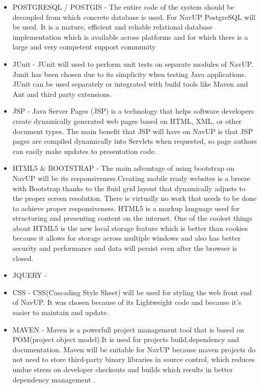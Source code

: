 \begin{itemize}
	\item POSTGRESQL / POSTGIS - The entire code of the system should be decoupled from which concrete database is used. For NavUP PostgreSQL will be used. It is a mature, efficient and reliable relational database implementation which is available across platforms and for which there is a large and very competent support community
	
	\item JUnit - JUnit will used to perform unit tests on separate modules of NavUP. Junit has been chosen due to its simplicity when testing Java applications. JUnit can be used separately or integrated with build tools like Maven and Ant and third party extensions.
	
	\item JSP - Java Server Pages (JSP) is a technology that helps software developers create dynamically generated web pages based on HTML, XML, or other document types. The main benefit that JSP will have on NavUP is that JSP pages are compiled dynamically into Servlets when requested, so page authors can easily make updates to presentation code.
	
	\item HTML5 \& BOOTSTRAP - The main advantage of using bootstrap on NavUP will be its responsiveness.Creating mobile ready websites is a breeze with Bootstrap thanks to the fluid grid layout that dynamically adjusts to the proper screen resolution. There is virtually no work that needs to be done to achieve proper responsiveness. HTML5 is a markup language used for structuring and presenting content on the internet. One of the coolest things about HTML5 is the new local storage feature which is better than cookies because it allows for storage across multiple windows and also has better security and performance and data will persist even after the browser is closed.
	
	\item JQUERY - 
	
	\item CSS - CSS(Cascading Style Sheet) will be used for styling the web front end of NavUP. It was chosen because of its Lightweight code and because it's easier to maintain and update. 
	
	\item MAVEN - Maven is a powerfull project management tool that is based on POM(project object model).It is used for projects build,dependency and documentation. Maven will be suitable for NavUP because maven projects do not need to store third-party binary libraries in source control, which reduces undue stress on developer checkouts and builds which results in better dependency management
.	
	

\end{itemize}

